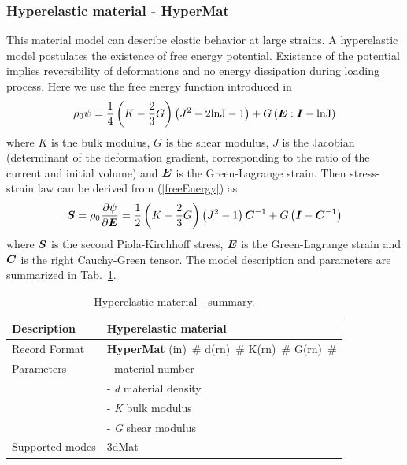 \documentclass[a4paper]{article}
\newcommand{\mbf}[1]{\mbox{\boldmath$#1$}}
\newcommand{\descitem}[1]{{\noindent \bf #1}}
\newcommand{\elemparam}[2]{{{#1\tiny (#2)}~\#}}
\newcommand{\param}[1]{{\it #1}}
\newenvironment{mmt}{\begin{tabular}{|l|p{9cm}|}}{\end{tabular}\\}
\newenvironment{mmt}{\begin{tabular}{|l|l|}}{\end{tabular}\\}
\begin{document}
\subsubsection{Hyperelastic material - HyperMat}
This material model can describe elastic behavior at large strains.
A hyperelastic model postulates the existence of free energy potential. Existence of the potential implies reversibility of deformations and no energy dissipation during loading process. Here we use the free energy function introduced in \cite{SimoHughes}
\begin{equation}\label{freeEnergy}
\rho_0 \psi = \frac{1}{4} \left(K - \frac{2}{3}G \right) \left( J^2 - 2 \rm{ln}J -1\right) + G \left(\mbf{E}:\mbf{I} - \rm{ln}J \right)
\end{equation}
where $K$ is the bulk modulus, $G$ is the shear modulus, $J$ is the Jacobian (determinant of the deformation gradient, corresponding to the ratio of the current and initial volume) and $\mbf{E}$ is the Green-Lagrange strain.
Then stress-strain law can be derived from (\ref{freeEnergy}) as
\begin{equation}
\mbf{S} = \rho_0 \frac{\partial \psi}{\partial \mbf{E}} = \frac{1}{2}\left(K - \frac{2}{3}G \right) \left(J^2 -1 \right)\mbf{C}^{-1} + G \left(\mbf{I} -\mbf{C}^{-1} \right)
\end{equation}
where $\mbf{S}$ is the second Piola-Kirchhoff stress, $\mbf{E}$ is the Green-Lagrange strain and $\mbf{C}$ is the right Cauchy-Green tensor.
The model description and parameters are summarized in Tab.~\ref{hyperElMat_table}.
\begin{table}[!htb]
\begin{mmt}
\hline
Description & Hyperelastic material\\
\hline
Record Format & \descitem{HyperMat}  \elemparam{}{in}
\elemparam{d}{rn} \elemparam{K}{rn} \elemparam{G}{rn} \\
Parameters &- \param{} material number\\
&- \param{d} material density\\
&- \param{K} bulk modulus\\
&- \param{G} shear modulus\\
Supported modes& 3dMat\\
\hline
\end{mmt}
\caption{Hyperelastic material - summary.}
\label{hyperElMat_table}
\end{table}
\end{document}
